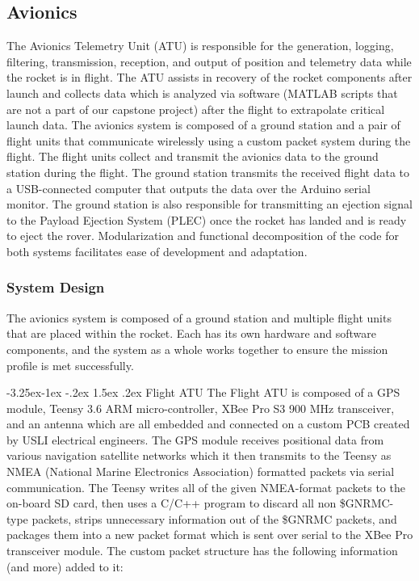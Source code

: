 \documentclass[onecolumn, draftclsnofoot, 10pt, compsoc]{IEEEtran}
\makeatletter
\renewcommand\paragraph{\@startsection{paragraph}{4}{\z@}%
                                     {-3.25ex\@plus -1ex \@minus -.2ex}%
                                     {1.5ex \@plus .2ex}%
                                     {\normalfont\normalsize\bfseries}}
\makeatother
\begin{document}
\subsection{Avionics}
The Avionics Telemetry Unit (ATU) is responsible for the generation, logging, filtering, transmission, reception, and output of position and telemetry data while the rocket is in flight. The ATU assists in recovery of the rocket components after launch and collects data which is analyzed via software (MATLAB scripts that are not a part of our capstone project) after the flight to extrapolate critical launch data. The avionics system is composed of a ground station and a pair of flight units that communicate wirelessly using a custom packet system during the flight. The flight units collect and transmit the avionics data to the ground station during the flight. The ground station transmits the received flight data to a USB-connected computer that outputs the data over the Arduino serial monitor. The ground station is also responsible for transmitting an ejection signal to the Payload Ejection System (PLEC) once the rocket has landed and is ready to eject the rover. Modularization and functional decomposition of the code for both systems facilitates ease of development and adaptation.

\subsubsection{System Design}
The avionics system is composed of a ground station and multiple flight units that are placed within the rocket. Each has its own hardware and software components, and the system as a whole works together to ensure the mission profile is met successfully.

\paragraph{Flight ATU}
The Flight ATU is composed of a GPS module, Teensy 3.6 ARM micro-controller, XBee Pro S3 900 MHz transceiver, and an antenna which are all embedded and connected on a custom PCB created by USLI electrical engineers. The GPS module receives positional data from various navigation satellite networks which it then transmits to the Teensy as NMEA (National Marine Electronics Association) formatted packets via serial communication. The Teensy writes all of the given NMEA-format packets to the on-board SD card, then uses a C/C++ program to discard all non \$GNRMC-type packets, strips unnecessary information out of the \$GNRMC packets, and packages them into a new packet format which is sent over serial to the XBee Pro transceiver module. The custom packet structure has the following information (and more) added to it:
\end{document}
